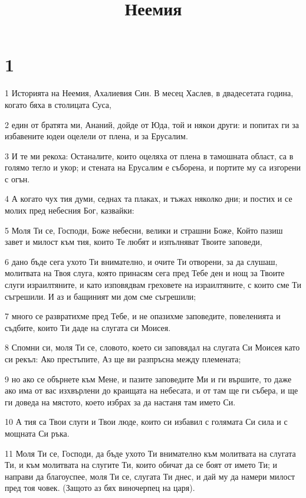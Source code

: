 

\title{Неемия}


\chapter{1}

\par 1 Историята на Неемия, Ахалиевия Син. В месец Хаслев, в двадесетата година, когато бяха в столицата Суса,
\par 2 един от братята ми, Ананий, дойде от Юда, той и някои други: и попитах ги за избавените юдеи оцелели от плена, и за Ерусалим.
\par 3 И те ми рекоха: Останалите, които оцеляха от плена в тамошната област, са в голямо тегло и укор; и стената на Ерусалим е съборена, и портите му са изгорени с огън.
\par 4 А когато чух тия думи, седнах та плаках, и тъжах няколко дни; и постих и се молих пред небесния Бог, казвайки:
\par 5 Моля Ти се, Господи, Боже небесни, велики и страшни Боже, Който пазиш завет и милост към тия, които Те любят и изпълняват Твоите заповеди,
\par 6 дано бъде сега ухото Ти внимателно, и очите Ти отворени, за да слушаш, молитвата на Твоя слуга, която принасям сега пред Тебе ден и нощ за Твоите слуги израилтяните, и като изповядвам греховете на израилтяните, с които сме Ти съгрешили. И аз и бащиният ми дом сме съгрешили;
\par 7 много се развратихме пред Тебе, и не опазихме заповедите, повеленията и съдбите, които Ти даде на слугата си Моисея.
\par 8 Спомни си, моля Ти се, словото, което си заповядал на слугата Си Моисея като си рекъл: Ако престъпите, Аз ще ви разпръсна между племената;
\par 9 но ако се обърнете към Мене, и пазите заповедите Ми и ги вършите, то даже ако има от вас изхвърлени до краищата на небесата, и от там ще ги събера, и ще ги доведа на мястото, което избрах за да настаня там името Си.
\par 10 А тия са Твои слуги и Твои люде, които си избавил с голямата Си сила и с мощната Си ръка.
\par 11 Моля Ти се, Господи, да бъде ухото Ти внимателно към молитвата на слугата Ти, и към молитвата на слугите Ти, които обичат да се боят от името Ти; и направи да благоуспее, моля Ти се, слугата Ти днес, и дай му да намери милост пред тоя човек. (Защото аз бях виночерпец на царя).

